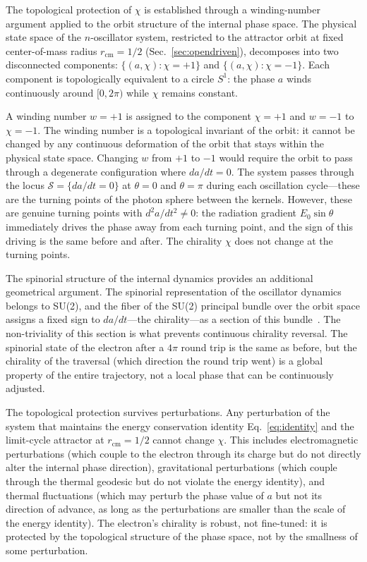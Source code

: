 \documentclass[%
 reprint, amsmath,amssymb, aps, prb, ]{revtex4-2}
\numberwithin{equation}{section}
\begin{document}
The topological protection of $\chi$ is established through a winding-number argument applied to the orbit structure of the internal phase space. The physical state space of the $n$-oscillator system, restricted to the attractor orbit at fixed center-of-mass radius $r_{\mathrm{cm}} = 1/2$ (Sec.~\ref{sec:opendriven}), decomposes into two disconnected components: $\{(a, \chi): \chi = +1\}$ and $\{(a, \chi): \chi = -1\}$. Each component is topologically equivalent to a circle $S^1$: the phase $a$ winds continuously around $[0, 2\pi)$ while $\chi$ remains constant.

A winding number $w = +1$ is assigned to the component $\chi = +1$ and $w = -1$ to $\chi = -1$. The winding number is a topological invariant of the orbit: it cannot be changed by any continuous deformation of the orbit that stays within the physical state space. Changing $w$ from $+1$ to $-1$ would require the orbit to pass through a degenerate configuration where $da/dt = 0$. The system passes through the locus $\mathcal{S} = \{da/dt = 0\}$ at $\theta = 0$ and $\theta = \pi$ during each oscillation cycle---these are the turning points of the photon sphere between the kernels. However, these are genuine turning points with $d^2 a/dt^2 \neq 0$: the radiation gradient $E_0 \sin\theta$ immediately drives the phase away from each turning point, and the sign of this driving is the same before and after. The chirality $\chi$ does not change at the turning points.

The spinorial structure of the internal dynamics provides an additional geometrical argument. The spinorial representation of the oscillator dynamics belongs to SU(2), and the fiber of the SU(2) principal bundle over the orbit space assigns a fixed sign to $da/dt$---the chirality---as a section of this bundle~\cite{hanamura48, hanamura45}. The non-triviality of this section is what prevents continuous chirality reversal. The spinorial state of the electron after a $4\pi$ round trip is the same as before, but the chirality of the traversal (which direction the round trip went) is a global property of the entire trajectory, not a local phase that can be continuously adjusted.

The topological protection survives perturbations. Any perturbation of the system that maintains the energy conservation identity Eq.~\eqref{eq:identity} and the limit-cycle attractor at $r_{\mathrm{cm}} = 1/2$ cannot change $\chi$. This includes electromagnetic perturbations (which couple to the electron through its charge but do not directly alter the internal phase direction), gravitational perturbations (which couple through the thermal geodesic but do not violate the energy identity), and thermal fluctuations (which may perturb the phase value of $a$ but not its direction of advance, as long as the perturbations are smaller than the scale of the energy identity). The electron's chirality is robust, not fine-tuned: it is protected by the topological structure of the phase space, not by the smallness of some perturbation.
\end{document}

